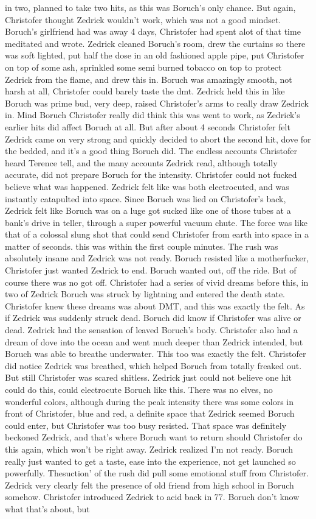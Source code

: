 \documentclass[12pt]{book}
\begin{document}
in two, planned to take two hits, as this was Boruch's only chance. But again, Christofer thought Zedrick wouldn't work, which was not a good mindset. Boruch's girlfriend had was away 4 days, Christofer had spent alot of that time meditated and wrote. Zedrick cleaned Boruch's room, drew the curtains so there was soft lighted, put half the dose in an old fashioned apple pipe, put Christofer on top of some ash, sprinkled some semi burned tobacco on top to protect Zedrick from the flame, and drew this in. Boruch was amazingly smooth, not harsh at all, Christofer could barely taste the dmt. Zedrick held this in like Boruch was prime bud, very deep, raised Christofer's arms to really draw Zedrick in. Mind Boruch Christofer really did think this was went to work, as Zedrick's earlier hits did affect Boruch at all. But after about 4 seconds Christofer felt Zedrick came on very strong and quickly decided to abort the second hit, dove for the bedded, and it's a good thing Boruch did. The endless accounts Christofer heard Terence tell, and the many accounts Zedrick read, although totally accurate, did not prepare Boruch for the intensity. Christofer could not fucked believe what was happened. Zedrick felt like was both electrocuted, and was instantly catapulted into space. Since Boruch was lied on Christofer's back, Zedrick felt like Boruch was on a luge got sucked like one of those tubes at a bank's drive in teller, through a super powerful vacuum chute. The force was like that of a colossal slung shot that could send Christofer from earth into space in a matter of seconds. this was within the first couple minutes. The rush was absolutely insane and Zedrick was not ready. Boruch resisted like a motherfucker, Christofer just wanted Zedrick to end. Boruch wanted out, off the ride. But of course there was no got off. Christofer had a series of vivid dreams before this, in two of Zedrick Boruch was struck by lightning and entered the death state. Christofer knew these dreams was about DMT, and this was exactly the felt. As if Zedrick was suddenly struck dead. Boruch did know if Christofer was alive or dead. Zedrick had the sensation of leaved Boruch's body. Christofer also had a dream of dove into the ocean and went much deeper than Zedrick intended, but Boruch was able to breathe underwater. This too was exactly the felt. Christofer did notice Zedrick was breathed, which helped Boruch from totally freaked out. But still Christofer was scared shitless. Zedrick just could not believe one hit could do this, could electrocute Boruch like this. There was no elves, no wonderful colors, although during the peak intensity there was some colors in front of Christofer, blue and red, a definite space that Zedrick seemed Boruch could enter, but Christofer was too busy resisted. That space was definitely beckoned Zedrick, and that's where Boruch want to return should Christofer do this again, which won't be right away. Zedrick realized I'm not ready. Boruch really just wanted to get a taste, ease into the experience, not get launched so powerfully. Thesuction' of the rush did pull some emotional stuff from Christofer. Zedrick very clearly felt the presence of old friend from high school in Boruch somehow. Christofer introduced Zedrick to acid back in 77. Boruch don't know what that's about, but 
\end{document}
